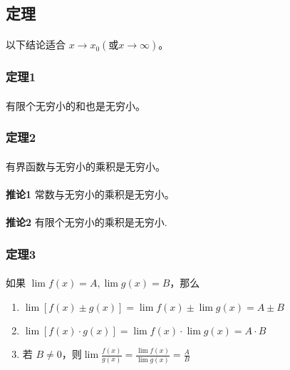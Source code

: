 \subsection{定理}
\paragraph{}
以下结论适合 $x \to x_0 (\text{或} x \to \infty)$。

\subsubsection{定理1}
\paragraph{}
有限个无穷小的和也是无穷小。

\subsubsection{定理2}
\paragraph{}
有界函数与无穷小的乘积是无穷小。

\paragraph{}
\textbf{推论1} 常数与无穷小的乘积是无穷小。

\paragraph{}
\textbf{推论2} 有限个无穷小的乘积是无穷小.

\subsubsection{定理3}
\paragraph{}
如果 $\lim f(x) = A, \lim g(x) =B$，那么

\begin{enumerate}
  \item $\lim [f(x) \pm g(x)] = \lim f(x) \pm \lim g(x) = A \pm B$
  \item $\lim [f(x) \cdot g(x)] = \lim f(x) \cdot \lim g(x) = A \cdot B$
  \item 若 $B \neq 0$，则$\lim \frac{f(x)}{g(x)} = \frac{\lim f(x)}{\lim g(x)} = \frac{A}{B}$
\end{enumerate}

